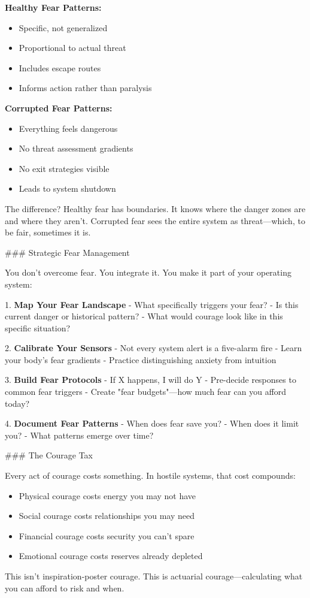 \documentclass[12pt]{book}
\begin{document}
\textbf{Healthy Fear Patterns:}
\begin{itemize}
\item Specific, not generalized
\item Proportional to actual threat
\item Includes escape routes
\item Informs action rather than paralysis

\end{itemize}
\textbf{Corrupted Fear Patterns:}
\begin{itemize}
\item Everything feels dangerous
\item No threat assessment gradients
\item No exit strategies visible
\item Leads to system shutdown

\end{itemize}
The difference? Healthy fear has boundaries. It knows where the danger zones are and where they aren't. Corrupted fear sees the entire system as threat—which, to be fair, sometimes it is.

\#\#\# Strategic Fear Management

You don't overcome fear. You integrate it. You make it part of your operating system:

1. \textbf{Map Your Fear Landscape}
   - What specifically triggers your fear?
   - Is this current danger or historical pattern?
   - What would courage look like in this specific situation?

2. \textbf{Calibrate Your Sensors}
   - Not every system alert is a five-alarm fire
   - Learn your body's fear gradients
   - Practice distinguishing anxiety from intuition

3. \textbf{Build Fear Protocols}
   - If X happens, I will do Y
   - Pre-decide responses to common fear triggers
   - Create "fear budgets"—how much fear can you afford today?

4. \textbf{Document Fear Patterns}
   - When does fear save you?
   - When does it limit you?
   - What patterns emerge over time?

\#\#\# The Courage Tax

Every act of courage costs something. In hostile systems, that cost compounds:

\begin{itemize}
\item Physical courage costs energy you may not have
\item Social courage costs relationships you may need
\item Financial courage costs security you can't spare
\item Emotional courage costs reserves already depleted

\end{itemize}
This isn't inspiration-poster courage. This is actuarial courage—calculating what you can afford to risk and when.
\end{document}
